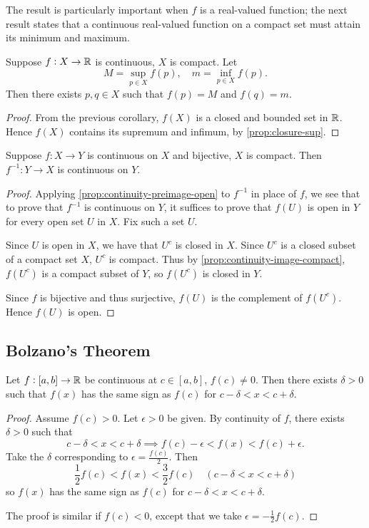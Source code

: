 The result is particularly important when $f$ is a real-valued function; the next result states that a continuous real-valued function on a compact set must attain its minimum and maximum. 

\begin{theorem}\label{thrm:extreme-value}
Suppose $f:X\to\mathbb R$ is continuous, $X$ is compact. Let
\[M=\sup_{p\in X}f(p),\quad m=\inf_{p\in X}f(p).\]
Then there exists $p,q\in X$ such that $f(p)=M$ and $f(q)=m$.
\end{theorem}

\begin{proof}
From the previous corollary, $f(X)$ is a closed and bounded set in $\mathbb R$. Hence $f(X)$ contains its supremum and infimum, by \cref{prop:closure-sup}.
\end{proof}

\begin{proposition}
Suppose $f:X\to Y$ is continuous on $X$ and bijective, $X$ is compact. Then $f^{-1}:Y\to X$ is continuous on $Y$.
\end{proposition}

\begin{proof}
Applying \cref{prop:continuity-preimage-open} to $f^{-1}$ in place of $f$, we see that to prove that $f^{-1}$ is continuous on $Y$, it suffices to prove that $f(U)$ is open in $Y$ for every open set $U$ in $X$. Fix such a set $U$.

Since $U$ is open in $X$, we have that $U^c$ is closed in $X$. Since $U^c$ is a closed subset of a compact set $X$, $U^c$ is compact. Thus by \cref{prop:continuity-image-compact}, $f(U^c)$ is a compact subset of $Y$, so $f(U^c)$ is closed in $Y$.

Since $f$ is bijective and thus surjective, $f(U)$ is the complement of $f(U^c)$. Hence $f(U)$ is open.
\end{proof}
\pagebreak

\subsection{Bolzano's Theorem}
\begin{lemma}
Let $f:[a,b]\to\mathbb R$ be continuous at $c\in[a,b]$, $f(c)\neq0$. Then there exists $\delta>0$ such that $f(x)$ has the same sign as $f(c)$ for $c-\delta<x<c+\delta$.
\end{lemma}

\begin{proof}
Assume $f(c)>0$. Let $\epsilon>0$ be given. By continuity of $f$, there exists $\delta>0$ such that 
\[c-\delta<x<c+\delta\implies f(c)-\epsilon<f(x)<f(c)+\epsilon.\]
Take the $\delta$ corresponding to $\epsilon=\frac{f(c)}{2}$. Then
\[\frac{1}{2}f(c)<f(x)<\frac{3}{2}f(c)\quad(c-\delta<x<c+\delta)\]
so $f(x)$ has the same sign as $f(c)$ for $c-\delta<x<c+\delta$. 

The proof is similar if $f(c)<0$, except that we take $\epsilon=-\frac{1}{2}f(c)$.
\end{proof}

